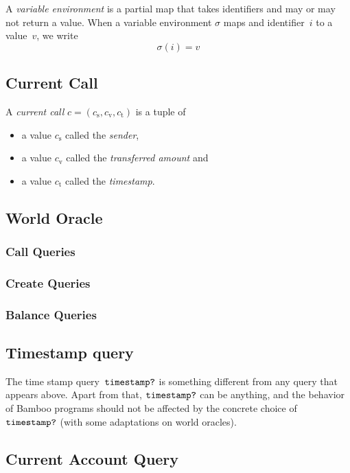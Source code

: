 \documentclass{book}
\begin{document}
A \textit{variable environment} is a partial map that takes identifiers and may or may not return a value.  When a variable environment $\sigma$ maps and identifier~$i$ to a value~$v$, we write
\[
\sigma(i) = v
\]

\subsection{Current Call}

A \textit{current call} $c = (c_\mathrm{s}, c_\mathrm{v}, c_\mathrm{t})$ is a tuple of
\begin{itemize}
\item a value $c_\mathrm{s}$ called the \textit{sender},
\item a value $c_\mathrm{v}$ called the \textit{transferred amount} and
\item a value $c_\mathrm{t}$ called the \textit{timestamp}.
\end{itemize}

\subsection{World Oracle}

\subsubsection{Call Queries}

\subsubsection{Create Queries}

\subsubsection{Balance Queries}

\subsection{Timestamp query}

\newcommand{\timestampQuery}{\text{\texttt{timestamp?}}}
The time stamp query~$\timestampQuery$ is something different from any query that appears above. Apart from that, $\timestampQuery$ can be anything, and the behavior of Bamboo programs should not be affected by the concrete choice of $\timestampQuery$ (with some adaptations on world oracles).

\subsection{Current Account Query}
\end{document}
